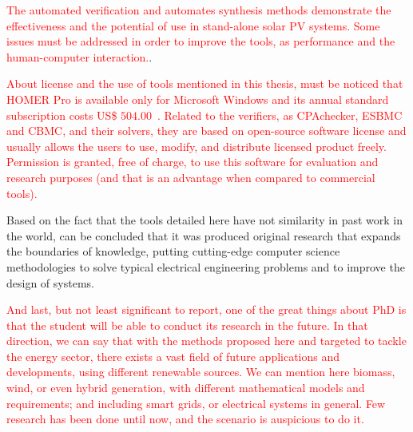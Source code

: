 \textcolor{red}{The automated verification and automates synthesis methods demonstrate the effectiveness and the potential of use in stand-alone solar PV systems. Some issues must be addressed in order to improve the tools, as performance and the human-computer interaction.}.

\textcolor{red}{About license and the use of tools mentioned in this thesis, must be noticed that HOMER Pro is available only for Microsoft Windows and its annual standard subscription costs US\$ $504.00$~\cite{HOMER}. Related to the verifiers, as CPAchecker, ESBMC and CBMC, and their solvers, they are based on open-source software license and usually allows the users to use, modify, and distribute licensed product freely. Permission is granted, free of charge, to use this software for evaluation and research purposes (and that is an advantage when compared to commercial tools).}

Based on the fact that the tools detailed here have not similarity in past work in the world, can be concluded that it was produced original research that expands the boundaries of knowledge, putting cutting-edge computer science methodologies to solve typical electrical engineering problems and to improve the design of systems.

\textcolor{red}{And last, but not least significant to report, one of the great things about PhD is that the student will be able to conduct its research in the future. In that direction, we can say that with the methods proposed here and targeted to tackle the energy sector, there exists a vast field of future applications and developments, using different renewable sources. We can mention here biomass, wind, or even hybrid generation, with different mathematical models and requirements; and including smart grids, or electrical systems in general. Few research has been done until now, and the scenario is auspicious to do it.}

